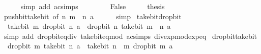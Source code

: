 \begin{isabellebody}
\ \ \ \ \isamarkupfalse%
\ {\isacharparenleft}{\kern0pt}simp\ add{\isacharcolon}{\kern0pt}\ ac{\isacharunderscore}{\kern0pt}simps{\isacharparenright}{\kern0pt}\isanewline
\ \ \ \ \isamarkupfalse%
\isanewline
{}\isamarkupfalse%
\isanewline
\ \ \isamarkupfalse%
\ False\isanewline
\ \ \isamarkupfalse%
\ \isamarkupfalse%
\ {\isacharquery}{\kern0pt}thesis\isanewline
\ \ \ \ \isamarkupfalse%
\ push{\isacharunderscore}{\kern0pt}bit{\isacharunderscore}{\kern0pt}take{\isacharunderscore}{\kern0pt}bit\ {\isacharbrackleft}{\kern0pt}of\ n\ {\isachardoublequoteopen}m\ {\isacharminus}{\kern0pt}\ n{\isachardoublequoteclose}\ a{\isacharbrackright}{\kern0pt}\isanewline
\ \ \ \ \isamarkupfalse%
\ simp\isanewline
{}\isamarkupfalse%
%
\endisatagproof
{\isafoldproof}%
%
\isadelimproof
\isanewline
%
\endisadelimproof
\isanewline
{}\isamarkupfalse%
\ take{\isacharunderscore}{\kern0pt}bit{\isacharunderscore}{\kern0pt}drop{\isacharunderscore}{\kern0pt}bit{\isacharcolon}{\kern0pt}\isanewline
\ \ {\isachardoublequoteopen}take{\isacharunderscore}{\kern0pt}bit\ m\ {\isacharparenleft}{\kern0pt}drop{\isacharunderscore}{\kern0pt}bit\ n\ a{\isacharparenright}{\kern0pt}\ {\isacharequal}{\kern0pt}\ drop{\isacharunderscore}{\kern0pt}bit\ n\ {\isacharparenleft}{\kern0pt}take{\isacharunderscore}{\kern0pt}bit\ {\isacharparenleft}{\kern0pt}m\ {\isacharplus}{\kern0pt}\ n{\isacharparenright}{\kern0pt}\ a{\isacharparenright}{\kern0pt}{\isachardoublequoteclose}\isanewline
%
\isadelimproof
\ \ %
\endisadelimproof
%
\isatagproof
{}\isamarkupfalse%
\ {\isacharparenleft}{\kern0pt}simp\ add{\isacharcolon}{\kern0pt}\ drop{\isacharunderscore}{\kern0pt}bit{\isacharunderscore}{\kern0pt}eq{\isacharunderscore}{\kern0pt}div\ take{\isacharunderscore}{\kern0pt}bit{\isacharunderscore}{\kern0pt}eq{\isacharunderscore}{\kern0pt}mod\ ac{\isacharunderscore}{\kern0pt}simps\ div{\isacharunderscore}{\kern0pt}exp{\isacharunderscore}{\kern0pt}mod{\isacharunderscore}{\kern0pt}exp{\isacharunderscore}{\kern0pt}eq{\isacharparenright}{\kern0pt}%
\endisatagproof
{\isafoldproof}%
%
\isadelimproof
\isanewline
%
\endisadelimproof
\isanewline
{}\isamarkupfalse%
\ drop{\isacharunderscore}{\kern0pt}bit{\isacharunderscore}{\kern0pt}take{\isacharunderscore}{\kern0pt}bit{\isacharcolon}{\kern0pt}\isanewline
\ \ {\isachardoublequoteopen}drop{\isacharunderscore}{\kern0pt}bit\ m\ {\isacharparenleft}{\kern0pt}take{\isacharunderscore}{\kern0pt}bit\ n\ a{\isacharparenright}{\kern0pt}\ {\isacharequal}{\kern0pt}\ take{\isacharunderscore}{\kern0pt}bit\ {\isacharparenleft}{\kern0pt}n\ {\isacharminus}{\kern0pt}\ m{\isacharparenright}{\kern0pt}\ {\isacharparenleft}{\kern0pt}drop{\isacharunderscore}{\kern0pt}bit\ m\ a{\isacharparenright}{\kern0pt}{\isachardoublequoteclose}\isanewline

\end{isabellebody}

